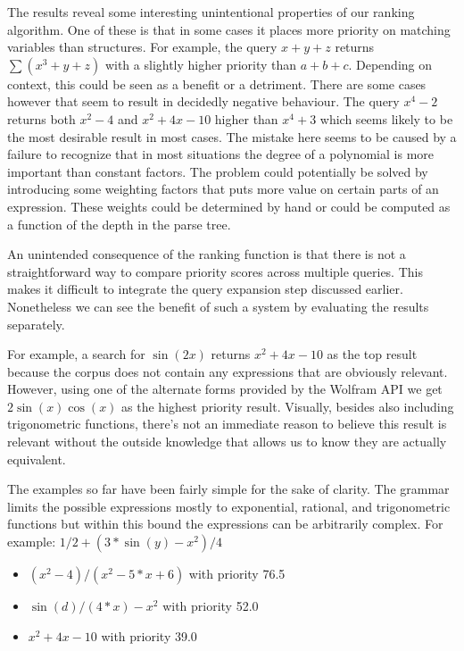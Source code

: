 \documentclass{sig-alternate}
\begin{document}
The results reveal some interesting unintentional properties of our ranking algorithm. One of these is that in
some cases it places more priority on matching variables than structures. For example, the query $x + y + z$ returns $\sum (x^3 + y+ z)$ with a slightly higher priority than $a + b + c$. Depending on context, this could
be seen as a benefit or a detriment. There are some cases however that seem to result in decidedly negative behaviour. The query $x^4 - 2$ returns both $x^2 - 4$ and $x^2 +  4x - 10$ higher than $x^4 + 3$ which seems likely to be the most desirable result in most cases. The mistake here seems to be caused by a failure to 
recognize that in most situations the degree of a polynomial is more important than constant factors. The 
problem could potentially be solved by introducing some weighting factors that puts more value on certain
parts of an expression. These weights could be determined by hand or could be computed as a function of the
depth in the parse tree.

An unintended consequence of the ranking function is that there is not a straightforward way to compare 
priority scores across multiple queries. This makes it difficult to integrate the query expansion step
discussed earlier. Nonetheless we can see the benefit of such a system by evaluating the results separately.

For example,  a search for $\sin(2x)$ returns $x^2 + 4x - 10$ as the top result because the corpus does not contain
any expressions that are obviously relevant. However, using one of the alternate forms provided by the 
Wolfram API we get $2\sin(x)\cos(x)$ as the highest priority result. Visually, besides also including
trigonometric functions, there's not an immediate reason to believe this result is relevant without the
outside knowledge that allows us to know they are actually equivalent.

The examples so far have been fairly simple for the sake of clarity. The grammar limits the possible 
expressions mostly to exponential, rational, and trigonometric functions but within this bound the expressions can be arbitrarily complex. For example: $1/2 + (3 * \sin(y) -x^2)/4$
\begin{itemize}
    \item $(x^2 - 4)/(x^2 - 5*x + 6)$ with priority  76.5
    \item $\sin(d)/(4*x) - x^2$  with priority  52.0
    \item $x^2 + 4x - 10$  with priority  39.0
\end{itemize}
\end{document}
